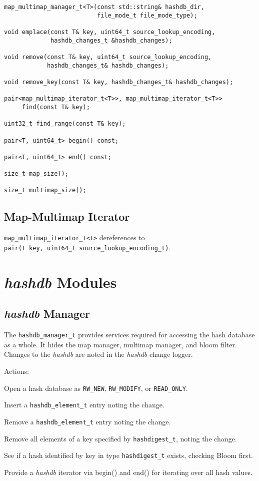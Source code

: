 \documentclass[12pt,twoside]{article}
\newcommand{\hdb}{\emph{hashdb}\xspace}
\begin{document}
\begin{small}
\begin{verbatim}
map_multimap_manager_t<T>(const std::string& hashdb_dir,
                          file_mode_t file_mode_type);

void emplace(const T& key, uint64_t source_lookup_encoding,
             hashdb_changes_t &hashdb_changes);

void remove(const T& key, uint64_t source_lookup_encoding,
            hashdb_changes_t& hashdb_changes);

void remove_key(const T& key, hashdb_changes_t& hashdb_changes);

pair<map_multimap_iterator_t<T>>, map_multimap_iterator_t<T>>
     find(const T& key);

uint32_t find_range(const T& key);

pair<T, uint64_t> begin() const;

pair<T, uint64_t> end() const;

size_t map_size();

size_t multimap_size();
\end{verbatim}
\end{small}

\subsection{Map-Multimap Iterator}
\texttt{map\_multimap\_iterator\_t<T>} dereferences to \\
\texttt{pair(T key, uint64\_t source\_lookup\_encoding\_t)}.

\section{\hdb Modules}
\subsection{\hdb Manager}
The \texttt{hashdb\_manager\_t}
provides services required for accessing the hash database
as a whole.  It hides the map manager, multimap manager, and bloom filter.
Changes to the \hdb are noted in the \hdb change logger.

Actions:
\begin{compactitem}
\item Open a hash database as
\texttt{RW\_NEW}, \texttt{RW\_MODIFY}, or \texttt{READ\_ONLY}.
\item Insert a \texttt{hashdb\_element\_t} entry noting the change.
\item Remove a \texttt{hashdb\_element\_t} entry noting the change.
\item Remove all elements of a key
specified by \texttt{hashdigest\_t}, noting the change.
\item See if a hash identified by key in
type \texttt{hashdigest\_t} exists, checking Bloom first.
\item Provide a \hdb iterator via begin() and end()
for iterating over all hash values.
\end{compactitem}
\end{document}
